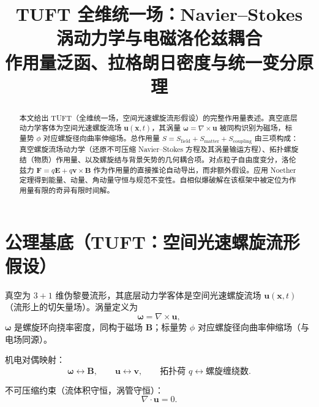 \documentclass[11pt]{ctexart}
\newcommand{\ve}[1]{\bm{#1}}                         %
\begin{document}
\title{\bfseries TUFT 全维统一场：Navier--Stokes 涡动力学与电磁洛伦兹耦合\\[6pt]
\large 作用量泛函、拉格朗日密度与统一变分原理}
\author{}
\date{}

\maketitle

\begin{abstract}
本文给出 TUFT（全维统一场，空间光速螺旋流形假设）的完整作用量表述。真空底层动力学客体为空间光速螺旋流场 $\ve{u}(\ve{x},t)$，其涡量 $\ve{\omega}=\nabla\times\ve{u}$ 被同构识别为磁场，标量势 $\phi$ 对应螺旋径向曲率伸缩场。总作用量 $S=S_{\mathrm{field}}+S_{\mathrm{matter}}+S_{\mathrm{coupling}}$ 由三项构成：真空螺旋流场动力学（还原不可压缩 Navier--Stokes 方程及其涡量输运方程）、拓扑螺旋结（物质）作用量、以及螺旋结与背景矢势的几何耦合项。对点粒子自由度变分，洛伦兹力 $\ve{F}=q\ve{E}+q\ve{v}\times\ve{B}$ 作为作用量的直接推论自动导出，而非额外假设。应用 Noether 定理得到能量、动量、角动量守恒与规范不变性。自相似爆破解在该框架中被定位为作用量有限的奇异有限时间解。
\end{abstract}

\section{公理基底（TUFT：空间光速螺旋流形假设）}

真空为 $3+1$ 维伪黎曼流形，其底层动力学客体是空间光速螺旋流场 $\ve{u}(\ve{x},t)$（流形上的切矢量场）。涡量定义为
\begin{equation}
\ve{\omega}=\nabla\times\ve{u},
\label{eq:vorticity}
\end{equation}
$\ve{\omega}$ 是螺旋环向挠率密度，同构于磁场 $\ve{B}$；标量势 $\phi$ 对应螺旋径向曲率伸缩场（与电场同源）。

机电对偶映射：
\begin{equation}
\ve{\omega}\leftrightarrow\ve{B},\qquad
\ve{u}\leftrightarrow\ve{v},\qquad
\text{拓扑荷 } q \leftrightarrow \text{螺旋缠绕数}.
\label{eq:duality}
\end{equation}

不可压缩约束（流体积守恒，涡管守恒）：
\begin{equation}
\nabla\cdot\ve{u}=0.
\label{eq:incompressible}
\end{equation}

\end{document}
